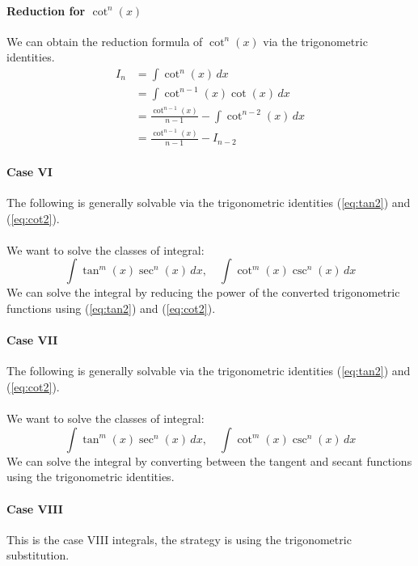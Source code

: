 \documentclass[11pt]{article}
\begin{document}
\paragraph{Reduction for $\cot^n(x)$} We can obtain the reduction formula of $\cot^n(x)$ via the trigonometric identities.
\begin{align}
    I_n &= \int \cot^n(x) \, dx \nonumber \\
    &= \int \cot^{n-1}(x) \cot(x) \, dx \nonumber \\
    &= \frac{\cot^{n-1}(x)}{n-1} - \int \cot^{n-2}(x) \, dx \nonumber \\
    &= \frac{\cot^{n-1}(x)}{n-1} - I_{n-2}
\end{align}
\paragraph{Case VI} The following is generally solvable via the trigonometric identities (\ref{eq:tan2}) and (\ref{eq:cot2}).
\paragraph{} We want to solve the classes of integral:
\begin{equation} 
    \int \tan^m(x) \sec^n(x) \, dx, \quad \int \cot^m(x) \csc^n(x) \, dx 
\end{equation}
We can solve the integral by reducing the power of the converted trigonometric functions using (\ref{eq:tan2}) and (\ref{eq:cot2}).
\paragraph{Case VII} The following is generally solvable via the trigonometric identities (\ref{eq:tan2}) and (\ref{eq:cot2}).
\paragraph{} We want to solve the classes of integral:
\begin{equation} \int \tan^m(x) \sec^n(x) \, dx, \quad \int \cot^m(x) \csc^n(x) \, dx \end{equation}
We can solve the integral by converting between the tangent and secant functions using the trigonometric identities.
\paragraph{Case VIII} This is the case VIII integrals, the strategy is using the trigonometric substitution.
\end{document}
